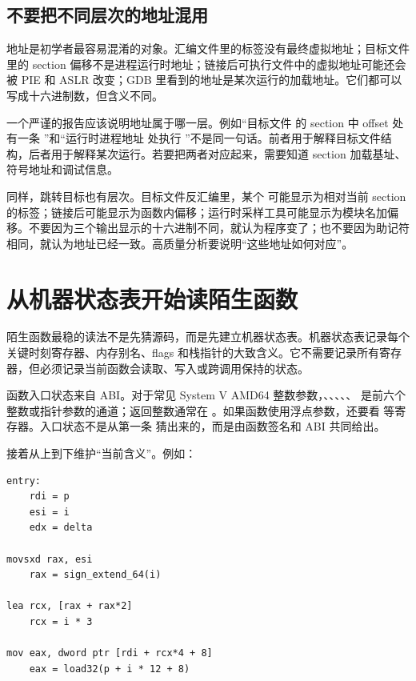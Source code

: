 \subsection{不要把不同层次的地址混用}

地址是初学者最容易混淆的对象。汇编文件里的标签没有最终虚拟地址；目标文件里的 section 偏移不是进程运行时地址；链接后可执行文件中的虚拟地址可能还会被 PIE 和 ASLR 改变；GDB 里看到的地址是某次运行的加载地址。它们都可以写成十六进制数，但含义不同。

一个严谨的报告应该说明地址属于哪一层。例如“目标文件  的  section 中 offset  处有一条 ”和“运行时进程地址  处执行 ”不是同一句话。前者用于解释目标文件结构，后者用于解释某次运行。若要把两者对应起来，需要知道 section 加载基址、符号地址和调试信息。

同样，跳转目标也有层次。目标文件反汇编里，某个  可能显示为相对当前 section 的标签；链接后可能显示为函数内偏移；运行时采样工具可能显示为模块名加偏移。不要因为三个输出显示的十六进制不同，就认为程序变了；也不要因为助记符相同，就认为地址已经一致。高质量分析要说明“这些地址如何对应”。

\section{从机器状态表开始读陌生函数}

陌生函数最稳的读法不是先猜源码，而是先建立机器状态表。机器状态表记录每个关键时刻寄存器、内存别名、flags 和栈指针的大致含义。它不需要记录所有寄存器，但必须记录当前函数会读取、写入或跨调用保持的状态。

函数入口状态来自 ABI。对于常见 System V AMD64 整数参数，、、、、、 是前六个整数或指针参数的通道；返回整数通常在 。如果函数使用浮点参数，还要看  等寄存器。入口状态不是从第一条  猜出来的，而是由函数签名和 ABI 共同给出。

接着从上到下维护“当前含义”。例如：

\begin{lstlisting}
entry:
    rdi = p
    esi = i
    edx = delta

movsxd rax, esi
    rax = sign_extend_64(i)

lea rcx, [rax + rax*2]
    rcx = i * 3

mov eax, dword ptr [rdi + rcx*4 + 8]
    eax = load32(p + i * 12 + 8)
\end{lstlisting}

